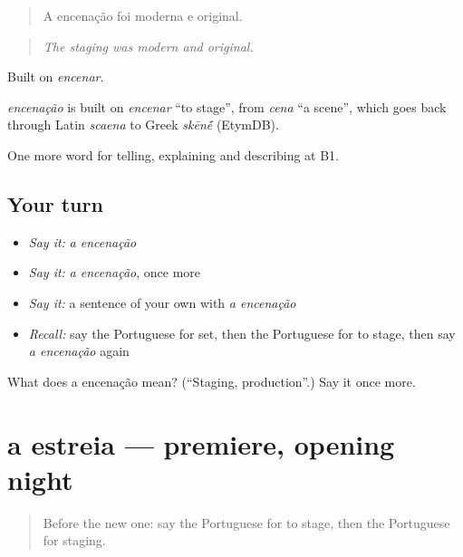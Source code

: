 \begin{quote}
A encenação foi moderna e original.
\end{quote}

\begin{quote}
\emph{The staging was modern and original.}
\end{quote}

Built on \emph{encenar}.

\begin{cousinweb}
\emph{encenação} is built on \emph{encenar} \textquotedblleft{}to stage\textquotedblright{}, from \emph{cena} \textquotedblleft{}a scene\textquotedblright{}, which goes back through Latin \emph{scaena} to Greek \emph{skēn\'{\={e}}} (EtymDB).
\end{cousinweb}

\begin{grammarlens}[title={What you've built}]
One more word for telling, explaining and describing at B1.
\end{grammarlens}

\subsection*{Your turn}
\begin{itemize}
\raggedright
  \item \emph{Say it:} \emph{a encenação}
  \item \emph{Say it:} \emph{a encenação}, once more
  \item \emph{Say it:} a sentence of your own with \emph{a encenação}
  \item \emph{Recall:} say the Portuguese for set, then the Portuguese for to stage, then say \emph{a encenação} again
\end{itemize}

\begin{tcolorbox}[breakable,colback=teal!4,colframe=teal!35!black,title={Before you move on}]
What does a encenação mean? (\textquotedblleft{}Staging, production\textquotedblright{}.) Say it once more.
\end{tcolorbox}
\section[a estreia]{a estreia — premiere, opening night}

\label{lesson:PT-C520-estreia}



\begin{quote}
Before the new one: say the Portuguese for to stage, then the Portuguese for staging.
\end{quote}

